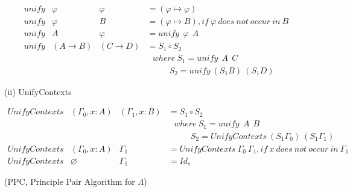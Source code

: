 \begin{equation*}
\begin{array}{llll}
unify & \varphi            & \varphi          & = (\varphi \mapsto \varphi)\\
unify & \varphi            & B                & = (\varphi \mapsto B), if\ \varphi \ does\ not\ occur\ in\ B\\
unify & A                  & \varphi          & = unify\ \ \varphi\ \ A\\
unify & (A\rightarrow B)   & (C\rightarrow D) & = S_1\circ S_2\\
&&&\ \ \ where\ S_1 = unify\ \ A\ \ C\\
&&&\ \ \ \ \ \ \ \ \ \ \ \ S_2 = unify\ (S_1B)\ (S_1D)
\end{array}
\end{equation*}


\noindent (ii) UnifyContexts

\begin{equation*}
\begin{array}{llll}
UnifyContexts & (\Gamma _0,x:A) & (\Gamma _1,x:B) & = S_1\circ S_2\\
&&&\ \ \ where\ S_1 = unify\ \ A\ \ B\\
&&&\ \ \ \ \ \ \ \ \ \ \ \ S_2 = UnifyContexts\ (S_1\Gamma _0)\ (S_1\Gamma _1)\\
UnifyContexts & (\Gamma _0,x:A) & \Gamma _1 & = UnifyContexts\ \Gamma _0\ \Gamma _1, if\ x\ does\ not\ occur\ in\ \Gamma _1\\
UnifyContexts & \varnothing & \Gamma _1 & =  Id_s
\end{array}
\end{equation*}



\begin{def1}{\label{def:ppc}}
\normalfont (PPC, Principle Pair Algorithm for $\Lambda$)
\end{def1}

